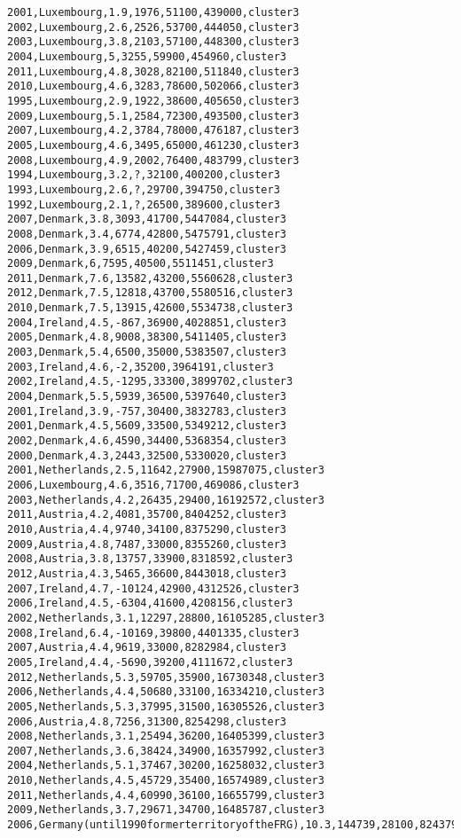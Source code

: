 \begin{lstlisting}[basicstyle=\footnotesize\ttfamily,numbers=none]
2001,Luxembourg,1.9,1976,51100,439000,cluster3
2002,Luxembourg,2.6,2526,53700,444050,cluster3
2003,Luxembourg,3.8,2103,57100,448300,cluster3
2004,Luxembourg,5,3255,59900,454960,cluster3
2011,Luxembourg,4.8,3028,82100,511840,cluster3
2010,Luxembourg,4.6,3283,78600,502066,cluster3
1995,Luxembourg,2.9,1922,38600,405650,cluster3
2009,Luxembourg,5.1,2584,72300,493500,cluster3
2007,Luxembourg,4.2,3784,78000,476187,cluster3
2005,Luxembourg,4.6,3495,65000,461230,cluster3
2008,Luxembourg,4.9,2002,76400,483799,cluster3
1994,Luxembourg,3.2,?,32100,400200,cluster3
1993,Luxembourg,2.6,?,29700,394750,cluster3
1992,Luxembourg,2.1,?,26500,389600,cluster3
2007,Denmark,3.8,3093,41700,5447084,cluster3
2008,Denmark,3.4,6774,42800,5475791,cluster3
2006,Denmark,3.9,6515,40200,5427459,cluster3
2009,Denmark,6,7595,40500,5511451,cluster3
2011,Denmark,7.6,13582,43200,5560628,cluster3
2012,Denmark,7.5,12818,43700,5580516,cluster3
2010,Denmark,7.5,13915,42600,5534738,cluster3
2004,Ireland,4.5,-867,36900,4028851,cluster3
2005,Denmark,4.8,9008,38300,5411405,cluster3
2003,Denmark,5.4,6500,35000,5383507,cluster3
2003,Ireland,4.6,-2,35200,3964191,cluster3
2002,Ireland,4.5,-1295,33300,3899702,cluster3
2004,Denmark,5.5,5939,36500,5397640,cluster3
2001,Ireland,3.9,-757,30400,3832783,cluster3
2001,Denmark,4.5,5609,33500,5349212,cluster3
2002,Denmark,4.6,4590,34400,5368354,cluster3
2000,Denmark,4.3,2443,32500,5330020,cluster3
2001,Netherlands,2.5,11642,27900,15987075,cluster3
2006,Luxembourg,4.6,3516,71700,469086,cluster3
2003,Netherlands,4.2,26435,29400,16192572,cluster3
2011,Austria,4.2,4081,35700,8404252,cluster3
2010,Austria,4.4,9740,34100,8375290,cluster3
2009,Austria,4.8,7487,33000,8355260,cluster3
2008,Austria,3.8,13757,33900,8318592,cluster3
2012,Austria,4.3,5465,36600,8443018,cluster3
2007,Ireland,4.7,-10124,42900,4312526,cluster3
2006,Ireland,4.5,-6304,41600,4208156,cluster3
2002,Netherlands,3.1,12297,28800,16105285,cluster3
2008,Ireland,6.4,-10169,39800,4401335,cluster3
2007,Austria,4.4,9619,33000,8282984,cluster3
2005,Ireland,4.4,-5690,39200,4111672,cluster3
2012,Netherlands,5.3,59705,35900,16730348,cluster3
2006,Netherlands,4.4,50680,33100,16334210,cluster3
2005,Netherlands,5.3,37995,31500,16305526,cluster3
2006,Austria,4.8,7256,31300,8254298,cluster3
2008,Netherlands,3.1,25494,36200,16405399,cluster3
2007,Netherlands,3.6,38424,34900,16357992,cluster3
2004,Netherlands,5.1,37467,30200,16258032,cluster3
2010,Netherlands,4.5,45729,35400,16574989,cluster3
2011,Netherlands,4.4,60990,36100,16655799,cluster3
2009,Netherlands,3.7,29671,34700,16485787,cluster3
2006,Germany(until1990formerterritoryoftheFRG),10.3,144739,28100,82437995,cluster4

\end{lstlisting}
